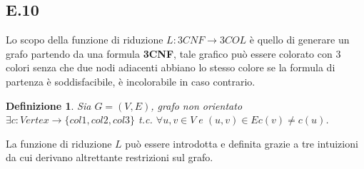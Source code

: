 \documentclass[a4paper]{article}
\newtheorem*{definition}{Definizione}
\begin{document}
\subsection{E.10}
Lo scopo della funzione di riduzione $L : 3CNF \rightarrow 3COL$ è quello di generare un grafo partendo da una formula \textbf{3CNF}, tale grafico può essere colorato con 3 colori senza che due nodi adiacenti abbiano lo stesso colore se la formula di partenza è soddisfacibile, è incolorabile in caso contrario.
\begin{definition}Sia $G = (V,E)$, grafo non orientato $\exists c : Vertex \rightarrow \{col1,col2,col3\}$ t.c. $\forall u,v \in V \; e \; (u,v) \in E c(v) \neq c(u)$.
\end{definition}
La funzione di riduzione $L$ può essere introdotta e definita grazie a tre intuizioni da cui derivano altrettante restrizioni sul grafo.
\end{document}
